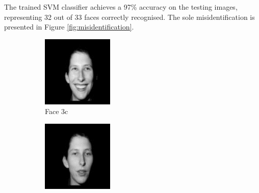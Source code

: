 The trained SVM classifier achieves a 97\% accuracy on the testing images, representing 32 out of 33 faces correctly recognised. The sole misidentification is presented in Figure \ref{fig:misidentification}.

\begin{figure}[ht]
  \centering
  \begin{subfigure}[b]{0.2\textwidth}
    \centering
    \includegraphics[width=\textwidth]{images/q3_face_3c.png}
    \caption{Face 3c}
  \end{subfigure}
  \hspace{3em}
  \begin{subfigure}[b]{0.2\textwidth}
    \centering
    \includegraphics[width=\textwidth]{images/q3_face_3a.png}

\end{subfigure}
\end{figure}
